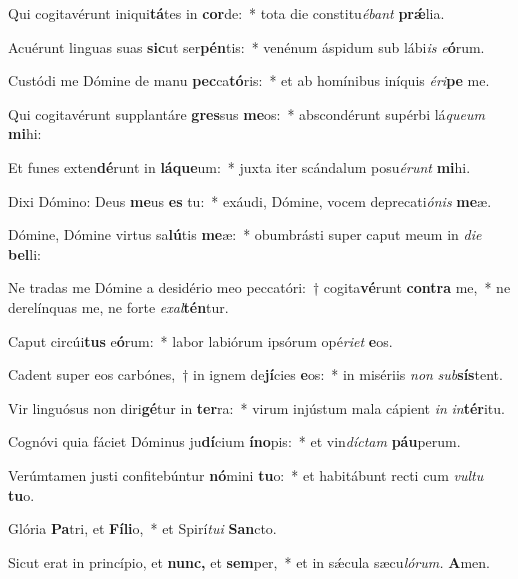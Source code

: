 \item Qui cogitavérunt iniqui\textbf{tá}tes in \textbf{cor}de:~* tota die constitu\tinyhspace\textit{ébant} \textbf{prǽ}lia.
\item Acuérunt linguas suas \textbf{sic}ut ser\textbf{pén}tis:~* venénum áspidum sub lábi\textit{is} \textit{e}\textbf{ó}rum.
\item Custódi me Dómine de manu \textbf{pec}ca\textbf{tó}ris:~* et ab homínibus iníquis \textit{éri}\textbf{pe} me.
\item Qui cogitavérunt supplantáre \textbf{gres}sus \textbf{me}os:~* abscondérunt supérbi lá\tinyhspace\textit{queum} \textbf{mi}hi:
\item Et funes exten\textbf{dé}runt in \textbf{lá}\textbf{que}um:~* juxta iter scándalum posu\tinyhspace\textit{érunt} \textbf{mi}hi.
\item Dixi Dómino: Deus \textbf{me}us \textbf{es} tu:~* exáudi, Dómine, vocem deprecati\textit{ónis} \textbf{me}æ.
\item Dómine, Dómine virtus sa\textbf{lú}tis \textbf{me}æ:~* obumbrásti super caput meum in \textit{die} \textbf{bel}li:
\item Ne tradas me Dómine a desidério meo peccatóri:~† cogita\textbf{vé}runt \textbf{con}\textbf{tra} me,~* ne derelínquas me, ne forte \textit{exal}\textbf{tén}tur.
\item Caput circúi\textbf{tus} e\textbf{ó}rum:~* labor labiórum i\-psórum opé\textit{riet} \textbf{e}os.
\item Cadent super eos carbónes,~† in ignem de\textbf{jí}cies \textbf{e}os:~* in misériis \textit{non} \textit{sub}\textbf{sís}tent.
\item Vir linguósus non diri\textbf{gé}tur in \textbf{ter}ra:~* virum injústum mala cápient \textit{in} \textit{in}\textbf{tér}itu.
\item Cognóvi quia fáciet Dóminus ju\textbf{dí}cium \textbf{ín}\textbf{o}pis:~* et vin\textit{díctam} \textbf{páu}perum.
\item Verúmtamen justi confitebúntur \textbf{nó}mini \textbf{tu}o:~* et habitábunt re\-cti cum \textit{vultu} \textbf{tu}o.
\item Glória \textbf{Pa}tri, et \textbf{Fí}\textbf{li}o,~* et Spirí\tinyhspace\textit{tui} \textbf{San}cto.
\item Sicut erat in princípio, et \textbf{nunc,} et \textbf{sem}per,~* et in sǽcula sæcu\tinyhspace\textit{lórum.} \textbf{A}men.